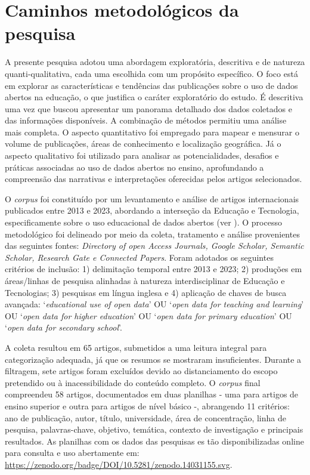 \documentclass[portuguese]{textolivre}
\begin{document}
\section{Caminhos metodológicos da pesquisa}\label{sec-conduta}
A presente pesquisa adotou uma abordagem exploratória, descritiva e de natureza quanti-qualitativa, cada uma escolhida com um propósito específico. O foco está em explorar as características e tendências das publicações sobre o uso de dados abertos na educação, o que justifica o caráter exploratório do estudo. É descritiva uma vez que buscou apresentar um panorama detalhado dos dados coletados e das informações disponíveis. A combinação de métodos permitiu uma análise mais completa. O aspecto quantitativo foi empregado para mapear e mensurar o volume de publicações, áreas de conhecimento e localização geográfica. Já o aspecto qualitativo foi utilizado para analisar as potencialidades, desafios e práticas associadas ao uso de dados abertos no ensino, aprofundando a compreensão das narrativas e interpretações oferecidas pelos artigos selecionados.

O \textit{corpus} foi constituído por um levantamento e análise de artigos internacionais publicados entre 2013 e 2023, abordando a interseção da Educação e Tecnologia, especificamente sobre o uso educacional de dados abertos (ver ). O processo metodológico foi delineado por meio da coleta, tratamento e análise provenientes das seguintes fontes: \textit{Directory of open Access Journals, Google Scholar, Semantic Scholar, Research Gate e Connected Papers}. Foram adotados os seguintes critérios de inclusão: 1) delimitação temporal entre 2013 e 2023; 2) produções em áreas/linhas de pesquisa alinhadas à natureza interdisciplinar de Educação e Tecnologias; 3) pesquisas em língua inglesa e 4) aplicação de chaves de busca avançada: ‘\textit{educational use of open data}’ OU ‘\textit{open data for teaching and learning}’ OU ‘\textit{open data for higher education}’ OU ‘\textit{open data for primary education}’ OU ‘\textit{open data for secondary school}’. 

A coleta resultou em 65 artigos, submetidos a uma leitura integral para categorização adequada, já que os resumos se mostraram insuficientes. Durante a filtragem, sete artigos foram excluídos devido ao distanciamento do escopo pretendido ou à inacessibilidade do conteúdo completo. O \textit{corpus} final compreendeu 58 artigos, documentados em duas planilhas - uma para artigos de ensino superior e outra para artigos de nível básico -, abrangendo 11 critérios: ano de publicação, autor, título, universidade, área de concentração, linha de pesquisa, palavras-chave, objetivo, temática, contexto de investigação e principais resultados. As planilhas com os dados das pesquisas es tão disponibilizadas online para consulta e uso abertamente em: \url{https://zenodo.org/badge/DOI/10.5281/zenodo.14031155.svg}.
\end{document}
